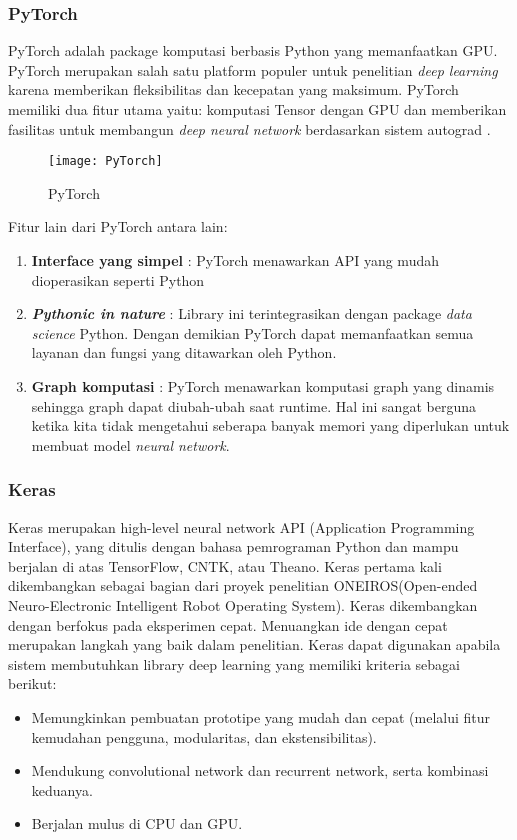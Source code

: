 \documentclass[../thesis.tex]{subfiles}
\begin{document}
\subsubsection{PyTorch}
PyTorch adalah package komputasi berbasis Python yang memanfaatkan GPU. PyTorch merupakan salah satu platform populer untuk penelitian \textit{deep learning} karena memberikan fleksibilitas dan kecepatan yang maksimum.
PyTorch memiliki dua fitur utama yaitu: komputasi Tensor dengan GPU dan memberikan fasilitas untuk membangun \textit{deep neural network} berdasarkan sistem autograd \cite{PyTorch}. 
\begin{figure}[htp]
	\centering
	\texttt{[image: PyTorch]}
	\caption{PyTorch}
	\label{PyTorch}
\end{figure}


Fitur lain dari PyTorch antara lain:
\begin{enumerate}
	\item \textbf{Interface yang simpel} : PyTorch menawarkan API yang mudah dioperasikan seperti Python
	\item \textbf{\textit{Pythonic in nature}} : Library ini terintegrasikan dengan package \textit{data science} Python. Dengan demikian PyTorch dapat memanfaatkan semua layanan dan fungsi yang ditawarkan oleh Python.
	\item \textbf{Graph komputasi} : PyTorch menawarkan komputasi graph yang dinamis sehingga graph dapat diubah-ubah saat runtime. Hal ini sangat berguna ketika kita tidak mengetahui seberapa banyak memori yang diperlukan untuk membuat model \textit{neural network}.
\end{enumerate}


\subsubsection{Keras}
Keras merupakan high-level neural network API (Application Programming Interface), yang ditulis dengan bahasa pemrograman Python dan mampu berjalan di atas TensorFlow, CNTK, atau
Theano. Keras pertama kali dikembangkan sebagai bagian dari proyek penelitian ONEIROS(Open-ended Neuro-Electronic Intelligent Robot Operating System). Keras dikembangkan dengan
berfokus pada eksperimen cepat. Menuangkan ide dengan cepat merupakan langkah yang baik dalam penelitian. Keras dapat digunakan apabila sistem membutuhkan library deep learning yang
memiliki kriteria sebagai berikut:
\begin{itemize}
	\item Memungkinkan pembuatan prototipe yang mudah dan cepat (melalui fitur kemudahan pengguna, modularitas, dan ekstensibilitas).
	\item Mendukung convolutional network dan recurrent network, serta kombinasi keduanya.
	\item Berjalan mulus di CPU dan GPU.
  \end{itemize}
\end{document}
